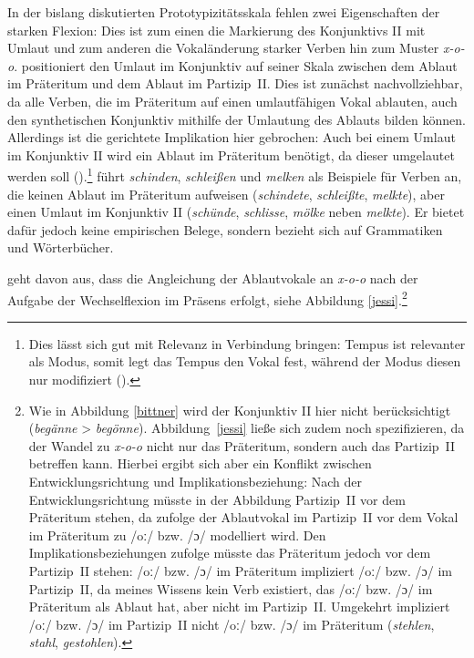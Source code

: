 In der bislang diskutierten Prototypizitätsskala fehlen zwei Eigenschaften der starken Fle\-xion: Dies ist zum einen die Markierung des Konjunktivs II mit Umlaut und zum anderen die Vokaländerung starker Verben hin zum Muster \textit{x-o-o}. \textcite[56--57]{Bittner.1985} positioniert den Umlaut im Konjunktiv auf seiner Skala zwischen dem Ablaut im Präteritum und dem Ablaut im Partizip~II. Dies ist zunächst nachvollziehbar, da alle Verben, die im Präteritum auf einen umlautfähigen Vokal ablauten, auch den synthetischen Konjunktiv mithilfe der Umlautung des Ablauts bilden können. Allerdings ist die gerichtete Implikation hier gebrochen: Auch bei einem Umlaut im Konjunktiv II wird ein Ablaut im Präteritum benötigt, da dieser umgelautet werden soll (\cite[129]{Nowak.2016}).\footnote{Dies lässt sich gut mit Relevanz in Verbindung bringen: Tempus ist relevanter als Modus, somit legt das Tempus den Vokal fest, während der Modus diesen nur modifiziert (\cite[195]{Nubling.2004}).} \textcite[56]{Bittner.1985} führt \textit{schinden}, \textit{schleißen} und \textit{melken} als Beispiele für Verben an, die keinen Ablaut im Präteritum aufweisen (\textit{schindete}, \textit{schleißte}, \textit{melkte}), aber einen Umlaut im Konjunktiv II (\textit{schünde}, \textit{schlisse}, \textit{mölke} neben \textit{melkte}). Er bietet dafür jedoch keine empirischen Belege, sondern bezieht sich auf Grammatiken und Wörterbücher. 



\textcite[179--180]{Nowak.2013} geht davon aus, dass die Angleichung der Ablautvokale an \textit{x-o-o} nach der Aufgabe der Wechselflexion im Präsens erfolgt, siehe Abbildung \ref{jessi}.\footnote{Wie in Abbildung \ref{bittner} wird der Konjunktiv II hier nicht berücksichtigt (\textit{begänne} > \textit{begönne}). Abbildung~\ref{jessi} ließe sich zudem noch spezifizieren, da der Wandel zu \textit{x-o-o} nicht nur das Präteritum, sondern auch das Partizip~II betreffen kann. Hierbei ergibt sich aber ein Konflikt zwischen Entwicklungsrichtung und Implikationsbeziehung: Nach der Entwicklungsrichtung müsste in der Abbildung Partizip~II vor dem Präteritum stehen, da \textcite[166]{Nowak.2018} zufolge der Ablautvokal im Partizip~II vor dem Vokal im Präteritum zu /oː/ bzw. /ɔ/ modelliert wird. Den Implikationsbeziehungen zufolge müsste das Präteritum jedoch vor dem Partizip~II stehen: /oː/ bzw. /ɔ/ im Präteritum impliziert /oː/ bzw. /ɔ/ im Partizip~II, da meines Wissens kein Verb existiert, das /oː/ bzw. /ɔ/ im Präteritum als Ablaut hat, aber nicht im Partizip~II. Umgekehrt impliziert /oː/ bzw. /ɔ/ im Partizip~II nicht /oː/ bzw. /ɔ/ im Präteritum (\textit{stehlen}, \textit{stahl}, \textit{gestohlen}).} 

